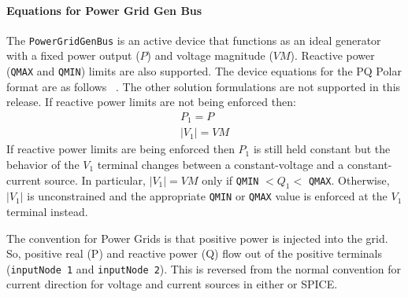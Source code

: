 \paragraph{Equations for Power Grid Gen Bus}
The \texttt{PowerGridGenBus} is an active device that functions as an ideal generator 
with a fixed power output ($P$) and voltage magnitude ($VM$).  Reactive power 
(\texttt{QMAX} and \texttt{QMIN}) limits are also supported.  The device equations
for the PQ Polar format are as follows ~\cite{Milano}.  The other solution formulations are 
not supported in this release.  If reactive power limits are not being enforced then:
\begin{eqnarray}
P_{1} = P \\|V_{1}| = VM
\end{eqnarray}
If reactive power limits are being enforced then $P_{1}$ is still held constant but the behavior
of the $V_{1}$ terminal changes between a constant-voltage and a constant-current source.
In particular, $|V_{1}| = VM$ only if \texttt{QMIN} $< Q_{1} <$ \texttt{QMAX}.  Otherwise, 
$|V_{1}|$ is unconstrained and the appropriate \texttt{QMIN} or \texttt{QMAX} value is 
enforced at the $V_{1}$ terminal instead.

The convention for Power Grids is that positive power is injected into the grid.
So, positive real (P) and reactive power (Q) flow out of the positive terminals 
(\texttt{inputNode 1} and \texttt{inputNode 2}).  This is reversed from the normal
convention for current direction for voltage and current sources in either \Xyce{} 
or SPICE.
